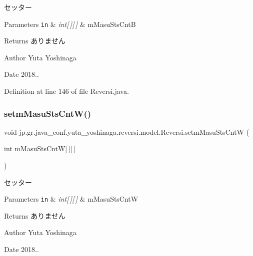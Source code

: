 セッター 


\begin{DoxyParams}[1]{Parameters}
\mbox{\tt in}  & {\em int\mbox{[}$\,$\mbox{]}\mbox{[}$\,$\mbox{]}} & m\+Masu\+Sts\+CntB \\
\hline
\end{DoxyParams}
\begin{DoxyReturn}{Returns}
ありません 
\end{DoxyReturn}
\begin{DoxyAuthor}{Author}
Yuta Yoshinaga 
\end{DoxyAuthor}
\begin{DoxyDate}{Date}
2018.. 
\end{DoxyDate}


Definition at line 146 of file Reversi.\+java.

\mbox{\label{classjp_1_1gr_1_1java__conf_1_1yuta__yoshinaga_1_1reversi_1_1model_1_1_reversi_a539082d7e05f2f91ac1350eae0de4f7d}} 
\subsubsection{\texorpdfstring{setm\+Masu\+Sts\+Cnt\+W()}{setmMasuStsCntW()}}
{\footnotesize\ttfamily void jp.\+gr.\+java\+\_\+conf.\+yuta\+\_\+yoshinaga.\+reversi.\+model.\+Reversi.\+setm\+Masu\+Sts\+CntW (\begin{DoxyParamCaption}\item[{int}]{m\+Masu\+Sts\+CntW\mbox{[}$\,$\mbox{]}\mbox{[}$\,$\mbox{]} }\end{DoxyParamCaption})}



セッター 


\begin{DoxyParams}[1]{Parameters}
\mbox{\tt in}  & {\em int\mbox{[}$\,$\mbox{]}\mbox{[}$\,$\mbox{]}} & m\+Masu\+Sts\+CntW \\
\hline
\end{DoxyParams}
\begin{DoxyReturn}{Returns}
ありません 
\end{DoxyReturn}
\begin{DoxyAuthor}{Author}
Yuta Yoshinaga 
\end{DoxyAuthor}
\begin{DoxyDate}{Date}
2018.. 
\end{DoxyDate}


